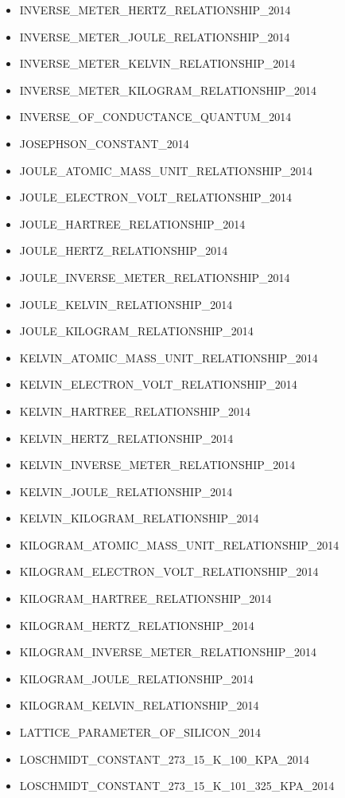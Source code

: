 \begin{itemize}
\item
  INVERSE\_METER\_HERTZ\_RELATIONSHIP\_2014
\item
  INVERSE\_METER\_JOULE\_RELATIONSHIP\_2014
\item
  INVERSE\_METER\_KELVIN\_RELATIONSHIP\_2014
\item
  INVERSE\_METER\_KILOGRAM\_RELATIONSHIP\_2014
\item
  INVERSE\_OF\_CONDUCTANCE\_QUANTUM\_2014
\item
  JOSEPHSON\_CONSTANT\_2014
\item
  JOULE\_ATOMIC\_MASS\_UNIT\_RELATIONSHIP\_2014
\item
  JOULE\_ELECTRON\_VOLT\_RELATIONSHIP\_2014
\item
  JOULE\_HARTREE\_RELATIONSHIP\_2014
\item
  JOULE\_HERTZ\_RELATIONSHIP\_2014
\item
  JOULE\_INVERSE\_METER\_RELATIONSHIP\_2014
\item
  JOULE\_KELVIN\_RELATIONSHIP\_2014
\item
  JOULE\_KILOGRAM\_RELATIONSHIP\_2014
\item
  KELVIN\_ATOMIC\_MASS\_UNIT\_RELATIONSHIP\_2014
\item
  KELVIN\_ELECTRON\_VOLT\_RELATIONSHIP\_2014
\item
  KELVIN\_HARTREE\_RELATIONSHIP\_2014
\item
  KELVIN\_HERTZ\_RELATIONSHIP\_2014
\item
  KELVIN\_INVERSE\_METER\_RELATIONSHIP\_2014
\item
  KELVIN\_JOULE\_RELATIONSHIP\_2014
\item
  KELVIN\_KILOGRAM\_RELATIONSHIP\_2014
\item
  KILOGRAM\_ATOMIC\_MASS\_UNIT\_RELATIONSHIP\_2014
\item
  KILOGRAM\_ELECTRON\_VOLT\_RELATIONSHIP\_2014
\item
  KILOGRAM\_HARTREE\_RELATIONSHIP\_2014
\item
  KILOGRAM\_HERTZ\_RELATIONSHIP\_2014
\item
  KILOGRAM\_INVERSE\_METER\_RELATIONSHIP\_2014
\item
  KILOGRAM\_JOULE\_RELATIONSHIP\_2014
\item
  KILOGRAM\_KELVIN\_RELATIONSHIP\_2014
\item
  LATTICE\_PARAMETER\_OF\_SILICON\_2014
\item
  LOSCHMIDT\_CONSTANT\_273\_15\_K\_100\_KPA\_2014
\item
  LOSCHMIDT\_CONSTANT\_273\_15\_K\_101\_325\_KPA\_2014

\end{itemize}

